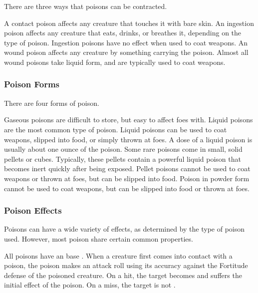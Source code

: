             There are three ways that poisons can be contracted.

             A contact poison affects any creature that touches it with bare skin.
             An ingestion poison affects any creature that eats, drinks, or breathes it, depending on the type of poison.
            Ingestion poisons have no effect when used to coat weapons.
             An wound poison affects any creature  by something carrying the poison.
            Almost all wound poisons take liquid form, and are typically used to coat weapons.

        \subsubsection{Poison Forms}\label{Poison Forms}

            There are four forms of poison.

             Gaseous poisons are difficult to store, but easy to affect foes with.
             Liquid poisons are the most common type of poison.
            Liquid poisons can be used to coat weapons, slipped into food, or simply thrown at foes.
            A dose of a liquid poison is usually about one ounce of the poison.
             Some rare poisons come in small, solid pellets or cubes.
            Typically, these pellets contain a powerful liquid poison that becomes inert quickly after being exposed.
            Pellet poisons cannot be used to coat weapons or thrown at foes, but can be slipped into food.
             Poison in powder form cannot be used to coat weapons, but can be slipped into food or thrown at foes.

        \subsubsection{Poison Effects}\label{Poison Effects}

            Poisons can have a wide variety of effects, as determined by the type of poison used.
            However, most poison share certain common properties.

            All poisons have an base .
            When a creature first comes into contact with a poison, the poison makes an attack roll using its accuracy against the Fortitude defense of the poisoned creature.
            On a hit, the target becomes  and suffers the initial effect of the poison.
            On a miss, the target is not .

